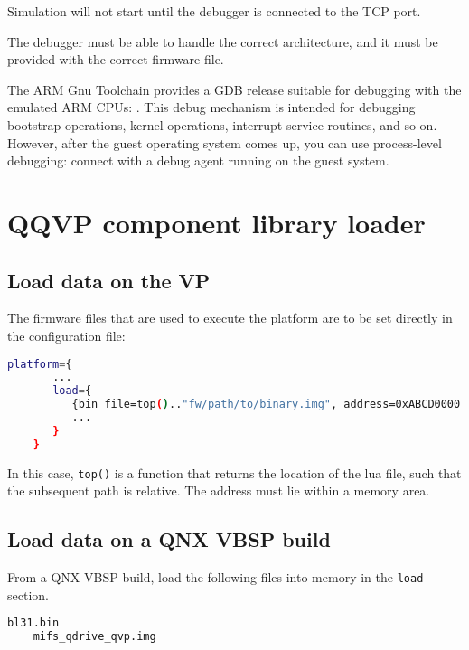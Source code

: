Simulation will not start until the debugger is connected to the TCP port.

\caution The debugger must be able to handle the correct architecture, and it must be provided with the correct firmware file.

The ARM Gnu Toolchain provides a GDB release suitable for debugging with the emulated ARM CPUs: {}. This debug mechanism is intended for debugging bootstrap operations, kernel operations, interrupt service routines, and so on. However, after the guest operating system comes up, you can use process-level debugging: connect with a debug agent running on the guest system.

\section{QQVP component library loader}

\subsection{Load data on the VP}
\label{sec:load-data-on-vp}

The firmware files that are used to execute the platform are to be set directly in the configuration file:

\small
\begin{lstlisting}[language=bash]
    platform={
       ...
       load={
          {bin_file=top().."fw/path/to/binary.img", address=0xABCD0000 };
          ...
       }
    }
\end{lstlisting}
\normalsize

In this case, {\small{\lstinline!top()!}} is a function that returns the location of the lua file, such that the subsequent path is relative. The address must lie within a memory area.


\subsection{Load data on a QNX VBSP build}

From a QNX VBSP build, load the following files into memory in the {\small{\lstinline!load!}} section.

\small
\begin{lstlisting}[language=bash]
    bl31.bin
    mifs_qdrive_qvp.img
\end{lstlisting}
\normalsize

